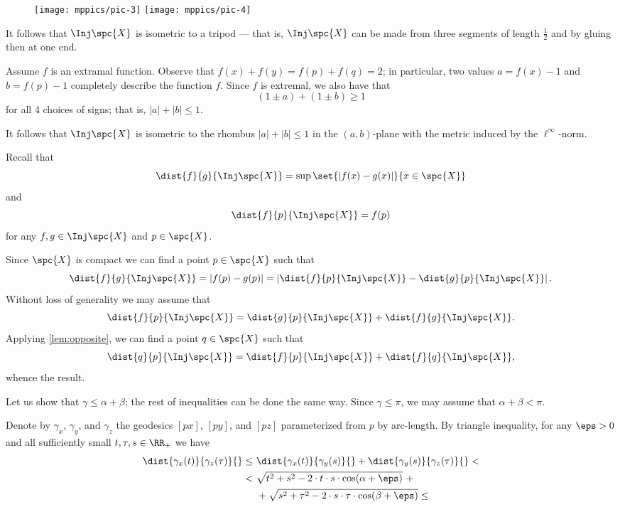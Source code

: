 \begin{wrapfigure}{o}{30 mm}
\vskip-0mm
\centering
\texttt{[image: mppics/pic-3]}
\bigskip
\texttt{[image: mppics/pic-4]}
\end{wrapfigure}

It follows that $\Inj\spc{X}$ is isometric to a tripod --- that is, $\Inj\spc{X}$ can be made from three segments of length $\tfrac12$ and by gluing then at one end.

Assume $f$ is an extramal function.
Observe that 
$f(x)+f(y)=f(p)+f(q)=2$;
in particular, two values $a=f(x)-1$ and $b=f(p)-1$ completely describe the function $f$.
Since $f$ is extremal, we also have that 
\[(1\pm a)+(1\pm b)\ge 1\]
for all 4 choices of signs;
that is, $|a|+|b|\le 1$.

It follows that $\Inj\spc{X}$ is isometric to the rhombus $|a|+|b|\le 1$ in the $(a,b)$-plane with the metric induced by the $\ell^\infty$-norm.





Recall that 
\[\dist{f}{g}{\Inj\spc{X}}=\sup\set{|f(x)-g(x)|}{x\in\spc{X}}\]
and 
\[\dist{f}{p}{\Inj\spc{X}}=f(p)\]
for any $f,g\in \Inj\spc{X}$ and $p\in \spc{X}$.

Since $\spc{X}$ is compact we can find a point $p\in\spc{X}$ such that 
\[\dist{f}{g}{\Inj\spc{X}}=|f(p)-g(p)|=\left|\dist{f}{p}{\Inj\spc{X}}-\dist{g}{p}{\Inj\spc{X}}\right|.\]
Without loss of generality we may assume that 
\[\dist{f}{p}{\Inj\spc{X}}
=
\dist{g}{p}{\Inj\spc{X}}
+
\dist{f}{g}{\Inj\spc{X}}.\]
Applying \ref{lem:opposite}, we can find a point $q\in\spc{X}$ such that 
\[\dist{q}{p}{\Inj\spc{X}}
=
\dist{f}{p}{\Inj\spc{X}}
+
\dist{f}{q}{\Inj\spc{X}},\]
whence the result.

Let us show that $\gamma\le\alpha+\beta$; the rest of inequalities can be done the same way.
Since $\gamma\le\pi$, we may assume that $\alpha+\beta< \pi$.

Denote by $\gamma_x$, $\gamma_y$, and $\gamma_z$ the geodesics $[px]$, $[py]$, and $[pz]$ parameterized from $p$ by arc-length.
By triangle inequality,
for any $\eps>0$ and all sufficiently small $t,\tau,s\in\RR_+$ we have
\begin{align*}
\dist{\gamma_x(t)}{\gamma_z(\tau)}{}
\le 
\ &\dist{\gamma_x(t)}{\gamma_y(s)}{}+\dist{\gamma_y(s)}{\gamma_z(\tau)}{}<\\
<
\ &\sqrt{t^2+s^2-2\cdot t\cdot  s\cdot \cos(\alpha+\eps)}\ +
\\
&+\sqrt{s^2+\tau^2-2\cdot s\cdot \tau\cdot \cos(\beta+\eps)}\le
\end{align*}

